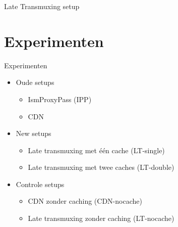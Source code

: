 \documentclass[xcolor=svgnames]{beamer}
\begin{document}
\begin{frame}{Late Transmuxing setup}
    \begin{figure}

        \resizebox*{!}{\dimexpr\textheight-2\baselineskip\relax}{%
            
        }
    \end{figure}

\end{frame}


\section{Experimenten}

\begin{frame}{Experimenten}
    \begin{itemize}
        \item Oude setups
            \begin{itemize}
                \item IsmProxyPass (IPP)
                \item CDN
            \end{itemize}
            \pause

        \item New setups
            \begin{itemize}
                \item Late transmuxing met één cache (LT-single)
                \item Late transmuxing met twee caches (LT-double)
            \end{itemize}
            \pause

        \item Controle setups
            \begin{itemize}
                \item CDN zonder caching (CDN-nocache)
                \item Late transmuxing zonder caching (LT-nocache)
            \end{itemize}

    \end{itemize}
\end{frame}
\end{document}
